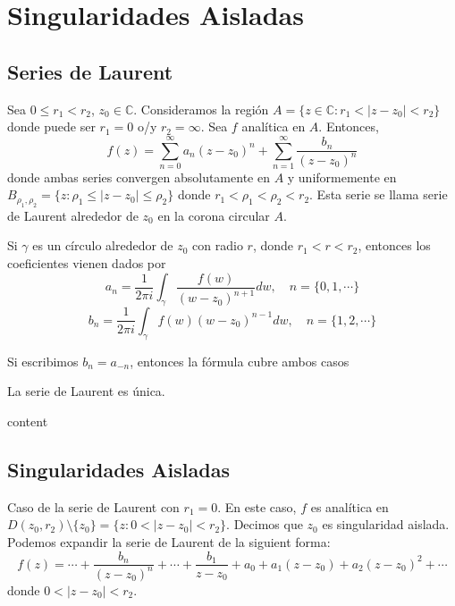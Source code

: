 \chapter{Singularidades Aisladas}

\section{Series de Laurent}

\begin{theo}
  Sea $0 \leq r_{1} < r_{2}$, $z_{0} \in \mathbb{C}$. Consideramos la región $A = \{ z \in \mathbb{C} : r_{1} < | z -z_{0} | < r_{2} \}$ donde puede ser $r_{1} = 0$ o/y $r_{2} = \infty$. Sea $f$ analítica en $A$. Entonces,
  \[ 
    f(z) = \sum_{n = 0}^{\infty} a_{n}(z - z_{0})^{n} + \sum_{n = 1}^{\infty} \frac{b_{n}}{(z - z_{0})^{n}} 
  \] 
  donde ambas series convergen absolutamente en $A$ y uniformemente en $B_{\rho_{1}, \rho_{2}} = \big\{ z : \rho_{1} \leq | z - z_{0} | \leq \rho_{2} \big\}$ donde $r_{1} < \rho_{1} < \rho_{2} < r_{2}$. Esta serie se llama serie de Laurent alrededor de $z_{0}$ en la corona circular $A$.

  Si $\gamma$ es un círculo alrededor de $z_{0}$ con radio $r$, donde $r_{1} < r < r_{2}$, entonces los coeficientes vienen dados por
  \[ 
    a_{n} = \frac{1}{2 \pi i} \int_{\gamma}^{} \frac{f(w)}{(w - z_{0})^{n + 1}} dw, \quad n = \{ 0, 1, \cdots \}
  \] 
  \[ 
    b_{n} = \frac{1}{2 \pi i} \int_{\gamma}^{} f(w){(w - z_{0})^{n - 1}} dw, \quad n = \{ 1, 2, \cdots \}
  \] 
\end{theo}

\begin{obs}
  Si escribimos $b_{n} = a_{-n}$, entonces la fórmula cubre ambos casos
\end{obs}

\begin{obs}
  La serie de Laurent es única.
\end{obs}

\begin{dem}
  content
\end{dem}

\section{Singularidades Aisladas}

\begin{defn}
  Caso de la serie de Laurent con $r_{1} = 0$. En este caso, $f$ es analítica en $D(z_{0}, r_{2}) \setminus \{ z_{0} \} = \{ z : 0 < | z -z_{0} | < r_{2} \}$. Decimos que $z_{0}$ es singularidad aislada. Podemos expandir la serie de Laurent de la siguient forma:
  \[ 
    f(z) = \cdots + \frac{b_{n}}{(z - z_{0})^{n}} + \cdots + \frac{b_{1}}{z - z_{0}} + a_{0} + a_{1}(z -z_{0}) + a_{2}(z - z_{0})^{2} + \cdots
  \] 
  donde $ 0 < | z - z_{0} | < r_{2}$.
\end{defn}

